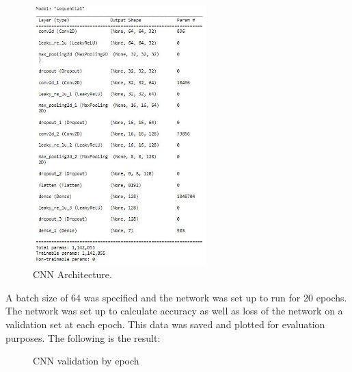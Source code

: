 \documentclass[11pt]{article}
\begin{document}
\begin{singlespace}
\begin{figure}[p]
    \centering
    \includegraphics[width=0.6\textwidth]{plots/CNN-structure.jpg}
    \caption{CNN Architecture.}
\end{figure} 

A batch size of 64 was specified and the network was set up to run for 20 epochs. The network was set up to calculate accuracy as well as loss of the network on a validation set at each epoch. This data was saved and plotted for evaluation purposes. The following is the result: \\

\begin{figure}[h]
    \centering
    
    \caption{CNN validation by epoch}
\end{figure} 


\end{singlespace}
\end{document}

